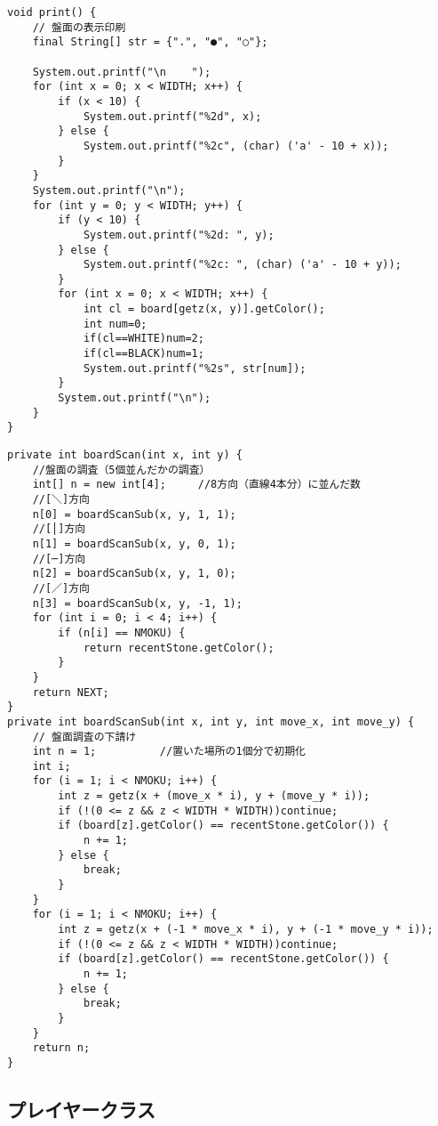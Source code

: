\documentclass[uplatex,a4paper,11pt,oneside,openany]{jsbook}
\begin{document}
\begin{lstlisting}[caption=盤面の表示印刷：盤面クラス内：N目並べ,label=prog28]
void print() {
    // 盤面の表示印刷
    final String[] str = {".", "●", "○"};

    System.out.printf("\n    ");
    for (int x = 0; x < WIDTH; x++) {
        if (x < 10) {
            System.out.printf("%2d", x);
        } else {
            System.out.printf("%2c", (char) ('a' - 10 + x));
        }
    }
    System.out.printf("\n");
    for (int y = 0; y < WIDTH; y++) {
        if (y < 10) {
            System.out.printf("%2d: ", y);
        } else {
            System.out.printf("%2c: ", (char) ('a' - 10 + y));
        }
        for (int x = 0; x < WIDTH; x++) {
            int cl = board[getz(x, y)].getColor();
            int num=0;
            if(cl==WHITE)num=2;
            if(cl==BLACK)num=1;
            System.out.printf("%2s", str[num]);
        }
        System.out.printf("\n");
    }
}
\end{lstlisting}

\begin{lstlisting}[caption=盤面の調査：盤面クラス内：N目並べ,label=prog29]
private int boardScan(int x, int y) {
    //盤面の調査（5個並んだかの調査）
    int[] n = new int[4];     //8方向（直線4本分）に並んだ数
    //[＼]方向
    n[0] = boardScanSub(x, y, 1, 1);
    //[│]方向
    n[1] = boardScanSub(x, y, 0, 1);
    //[─]方向
    n[2] = boardScanSub(x, y, 1, 0);
    //[／]方向
    n[3] = boardScanSub(x, y, -1, 1);
    for (int i = 0; i < 4; i++) {
        if (n[i] == NMOKU) {
            return recentStone.getColor();
        }
    }
    return NEXT;
}
private int boardScanSub(int x, int y, int move_x, int move_y) {
    // 盤面調査の下請け
    int n = 1;          //置いた場所の1個分で初期化
    int i;
    for (i = 1; i < NMOKU; i++) {
        int z = getz(x + (move_x * i), y + (move_y * i));
        if (!(0 <= z && z < WIDTH * WIDTH))continue;
        if (board[z].getColor() == recentStone.getColor()) {
            n += 1;
        } else {
            break;
        }
    }
    for (i = 1; i < NMOKU; i++) {
        int z = getz(x + (-1 * move_x * i), y + (-1 * move_y * i));
        if (!(0 <= z && z < WIDTH * WIDTH))continue;
        if (board[z].getColor() == recentStone.getColor()) {
            n += 1;
        } else {
            break;
        }
    }
    return n;
}
\end{lstlisting}

\subsection{プレイヤークラス}
\end{document}
